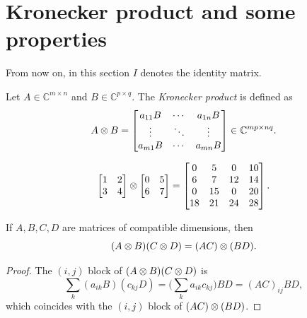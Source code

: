 \chapter{Kronecker product and some properties}

From now on, in this section $I$ denotes the identity matrix.

\begin{definition}
    Let $A \in \mathbb{C}^{m \times n}$ and $B \in \mathbb{C}^{p \times q}$. 
    The \emph{Kronecker product} is defined as
    \[
        A \otimes B = 
        \begin{bmatrix}
            a_{11}B & \cdots & a_{1n}B \\
            \vdots & \ddots & \vdots \\
            a_{m1}B & \cdots & a_{mn}B
        \end{bmatrix} \in \mathbb{C}^{mp \times nq}.
    \]
    \label{ch:krondef}
\end{definition}

\begin{example}
\[
    \begin{bmatrix}
        1 & 2 \\
        3 & 4
    \end{bmatrix}
    \otimes
    \begin{bmatrix}
        0 & 5 \\
        6 & 7
    \end{bmatrix} 
    =
    \begin{bmatrix}
        0 & 5 & 0 & 10 \\
        6 & 7 & 12 & 14 \\
        0 & 15 & 0 & 20 \\
        18 & 21 & 24 & 28
    \end{bmatrix}.
\]
\end{example}

\begin{proposition}
    If $A,B,C,D$ are matrices of compatible dimensions, then
    \[
        (A \otimes B)(C \otimes D) = (AC) \otimes (BD).
    \]
    \label{prop:prod}
\end{proposition}

\begin{proof}
    The $(i,j)$ block of $(A \otimes B)(C \otimes D)$ is
    \[
        \sum_k (a_{ik}B)(c_{kj}D) = \Big(\sum_k a_{ik}c_{kj}\Big) BD = (AC)_{ij}BD,
    \]
    which coincides with the $(i,j)$ block of $(AC) \otimes (BD)$.
\end{proof}

